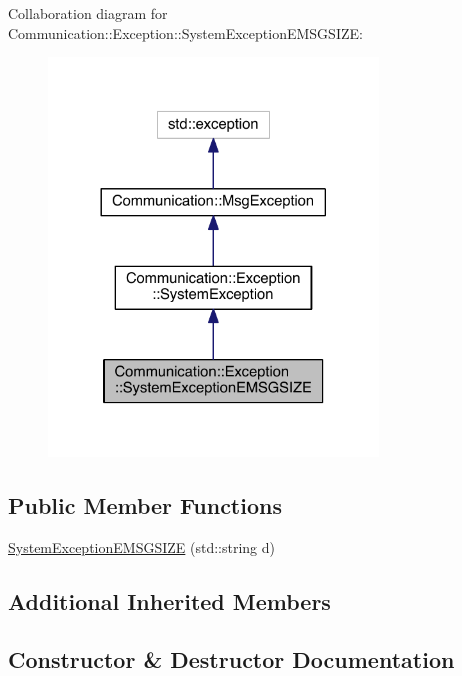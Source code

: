 Collaboration diagram for Communication\+:\+:Exception\+:\+:System\+Exception\+E\+M\+S\+G\+S\+I\+Z\+E\+:\nopagebreak
\begin{figure}[H]
\begin{center}
\leavevmode
\includegraphics[width=248pt]{class_communication_1_1_exception_1_1_system_exception_e_m_s_g_s_i_z_e__coll__graph}
\end{center}
\end{figure}
\subsection*{Public Member Functions}
\begin{DoxyCompactItemize}
\item 
\hyperlink{class_communication_1_1_exception_1_1_system_exception_e_m_s_g_s_i_z_e_a1d0a37bf301c2cdea144fb8b83813b6a}{System\+Exception\+E\+M\+S\+G\+S\+I\+Z\+E} (std\+::string d)
\end{DoxyCompactItemize}
\subsection*{Additional Inherited Members}


\subsection{Constructor \& Destructor Documentation}
\hypertarget{class_communication_1_1_exception_1_1_system_exception_e_m_s_g_s_i_z_e_a1d0a37bf301c2cdea144fb8b83813b6a}{}

